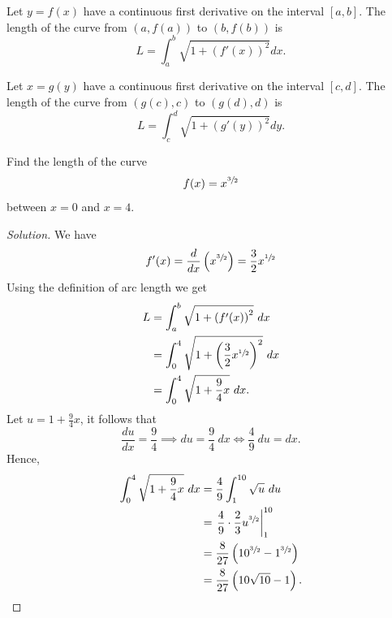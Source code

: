 \documentclass[compacto,10pt,comentarios]{aleph-notas}
\begin{document}
\begin{defi}[\textbf{Arc Length for $y = f(x)$}]
    Let $y = f(x)$ have a continuous first derivative on the interval $[a, b]$. The length of the curve from $\left(a, f(a)\right)$ to $\left(b, f(b)\right)$ is
    $$
        L = \int_{a}^{b} \sqrt{1 + \left( f'(x) \right) ^ {2}} dx.
    $$
\end{defi}

\begin{defi}[\textbf{Arc Length for $x = g(y)$}]
    Let $x = g(y)$ have a continuous first derivative on the interval $[c, d]$. The length of the curve from $\left(g(c), c\right)$ to $\left(g(d), d\right)$ is
    $$
        L = \int_{c}^{d} \sqrt{1 + \left( g'(y) \right) ^ {2}} dy.
    $$
\end{defi}

\begin{ejer}
    Find the length of the curve 
    $$
        f(x) = x^{\sfrac{3}{2}}
    $$
    between $x=0$ and $x=4$.
\end{ejer}

\begin{proof}[Solution]
    We have
    \begin{align*}
        f'(x) = \frac{d}{dx} \left( x^{\sfrac{3}{2}} \right) = \frac{3}{2} x ^ {\sfrac{1}{2}}
    \end{align*}
    Using the definition of arc length we get 
    \begin{align*}
        L & = \int_{a}^{b} \sqrt{1 + \left( f'(x) \right) ^ {2}} ~ dx \\
        & = \int_{0}^{4} \sqrt{1 + \left( \frac{3}{2} x ^ {\sfrac{1}{2}} \right)^{2} } ~ dx \\
        & = \int_{0}^{4} \sqrt{1 + \frac{9}{4}x} ~ dx.
    \end{align*}
    Let $u = 1 + \frac{9}{4}x$, it  follows that
    $$
        \frac{du}{dx} = \frac{9}{4} \implies du = \frac{9}{4} ~ dx \iff \frac{4}{9} ~ du = dx.
    $$
    Hence,
    \begin{align*}
        \int_{0}^{4} \sqrt{1 + \frac{9}{4}x} ~ dx  & = \frac{4}{9} \int_{1}^{10} \sqrt{u} ~ du \\
        & = \left. \frac{4}{9} \cdot \frac{2}{3} u^{\sfrac{3}{2}} \right\rvert_{1}^{10} \\ 
        & = \frac{8}{27} \left( 10 ^ {\sfrac{3}{2}} - 1 ^ {\sfrac{3}{2} }\right) \\
        & = \frac{8}{27} \left( 10 \sqrt{10}  - 1 \right) .
    \end{align*}
\end{proof}
\end{document}
